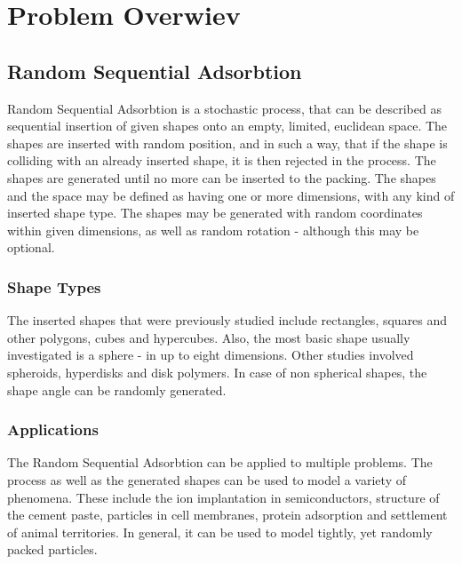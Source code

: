\documentclass[12pt, oneside]{report}
\begin{document}

\tableofcontents
\newpage


\chapter{Problem Overwiev}
\section {Random Sequential Adsorbtion}

Random Sequential Adsorbtion is a stochastic process, that can be described as sequential insertion of given shapes onto an empty, limited, euclidean space. The shapes are inserted with random position, and in such a way, that if the shape is colliding with an already inserted shape, it is then rejected in the process. The shapes are generated until no more can be inserted to the packing. The shapes and the space may be defined as having one or more dimensions, with any kind of inserted shape type. The shapes may be generated with random coordinates within given dimensions, as well as random rotation - although this may be optional\cite{zhang,feder}.

\subsection {Shape Types}

The inserted shapes that were previously studied include rectangles, squares and other polygons, cubes and hypercubes. Also, the most basic shape usually investigated is a sphere - in up to eight dimensions. Other studies involved spheroids, hyperdisks and disk polymers. In case of non spherical shapes, the shape angle can be randomly generated\cite{zhang}.

\subsection {Applications}

The Random Sequential Adsorbtion can be applied to multiple problems. The process as well as the generated shapes can be used to model a variety of phenomena. These include the ion implantation in semiconductors, structure of the cement paste, particles in cell membranes, protein adsorption and settlement of animal territories\cite{zhang}. In general, it can be used to model tightly, yet randomly packed particles.
\newline
\end{document}
